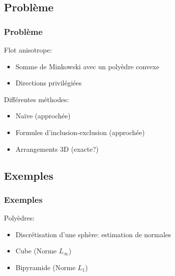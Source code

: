 \documentclass{beamer}
\begin{document}
\subsection{Problème}
\begin{frame}
    \frametitle{Problème}

    Flot anisotrope:
    \begin{itemize}
        \item Somme de Minkowski avec un polyèdre convexe
        \item Directions privilégiées
    \end{itemize}

    Différentes méthodes:
    \begin{itemize}
        \item Naïve (approchée)
        \item Formules d'inclusion-exclusion (approchée)
        \item Arrangements 3D (exacte?)
    \end{itemize}
\end{frame}

\subsection{Exemples}
\begin{frame}
    \frametitle{Exemples}

    Polyèdres:
    \begin{itemize}
        \item Discrétisation d'une sphère: estimation de normales
        \item Cube (Norme $ L_{\infty} $)
        \item Bipyramide (Norme $ L_1 $)
    \end{itemize}
\end{frame}
\end{document}
